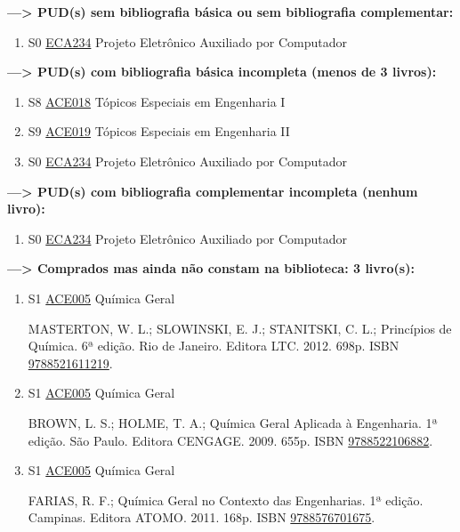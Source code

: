 \documentclass[12pt,a4paper]{book}
\begin{document}
 \textbf{---> PUD(s) sem bibliografia básica ou sem bibliografia complementar:}\label{PUDSEMBIB}
\begin{enumerate}
 \item S0 \hyperref[PUD:ECA234]{ECA234} Projeto Eletrônico Auxiliado por Computador

\end{enumerate}
\newpage


 \textbf{---> PUD(s) com bibliografia básica incompleta (menos de 3 livros):}\label{PUDBIBBASINC}
\begin{enumerate}
 \item S8 \hyperref[PUD:ACE018]{ACE018} Tópicos Especiais em Engenharia I


 \item S9 \hyperref[PUD:ACE019]{ACE019} Tópicos Especiais em Engenharia II


 \item S0 \hyperref[PUD:ECA234]{ECA234} Projeto Eletrônico Auxiliado por Computador

\end{enumerate}
\newpage


 \textbf{---> PUD(s) com bibliografia complementar incompleta (nenhum livro):}\label{PUDBIBCOMPINC}
\begin{enumerate}
 \item S0 \hyperref[PUD:ECA234]{ECA234} Projeto Eletrônico Auxiliado por Computador

\end{enumerate}
\newpage


 \textbf{---> Comprados mas ainda não constam na biblioteca: 3 livro(s):}\label{COMPRADOS}
\begin{enumerate}
 \item S1 \hyperref[PUD:ACE005]{ACE005} Química Geral

 MASTERTON, W.  L.;  SLOWINSKI, E.  J.;  STANITSKI, C.  L.;  Princípios de Química.  6ª edição.  Rio de Janeiro.  Editora LTC.  2012.  698p.  ISBN \href{http://www.bn.br/site/pages/servicosProfissionais/agenciaISBN/isbnBusca/FbnBuscaISBNCatalogo.asp?pField=ISBN&pIntPagina=1&pISBN=21611219&nidbISBN=true&hidbISBN=true}{9788521611219}. 
 
 
 \item S1 \hyperref[PUD:ACE005]{ACE005} Química Geral

 BROWN, L.  S.;  HOLME, T.  A.;  Química Geral Aplicada à Engenharia.  1ª edição.  São Paulo.  Editora CENGAGE.  2009.  655p.  ISBN \href{http://www.bn.br/site/pages/servicosProfissionais/agenciaISBN/isbnBusca/FbnBuscaISBNCatalogo.asp?pField=ISBN&pIntPagina=1&pISBN=22106882&nidbISBN=true&hidbISBN=true}{9788522106882}. 
 
 
 \item S1 \hyperref[PUD:ACE005]{ACE005} Química Geral

 FARIAS, R.  F.;  Química Geral no Contexto das Engenharias.  1ª edição.  Campinas.  Editora ATOMO.  2011.  168p.  ISBN \href{http://www.bn.br/site/pages/servicosProfissionais/agenciaISBN/isbnBusca/FbnBuscaISBNCatalogo.asp?pField=ISBN&pIntPagina=1&pISBN=76701675&nidbISBN=true&hidbISBN=true}{9788576701675}.\end{enumerate}
\newpage
\end{document}
